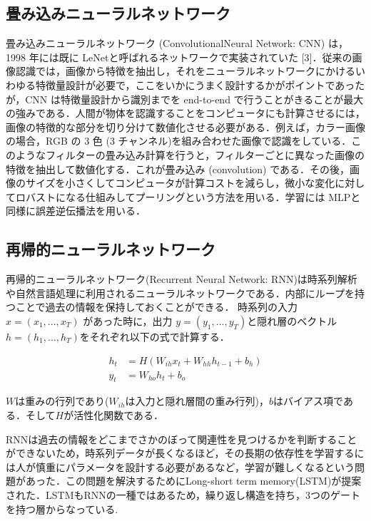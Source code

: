 \subsection{畳み込みニューラルネットワーク}
畳み込みニューラルネットワーク (ConvolutionalNeural Network: CNN) は，1998 年には既に LeNetと呼ばれるネットワークで実装されていた [3]．従来の画像認識では，画像から特徴を抽出し，それをニューラルネットワークにかけるいわゆる特徴量設計が必要で，ここをいかにうまく設計するかがポイントであったが，CNN は特徴量設計から識別までを end-to-end で行うことがきることが最大の強みである．人間が物体を認識することをコンピュータにも計算させるには，画像の特徴的な部分を切り分けて数値化させる必要がある．例えば，カラー画像の場合，RGB の 3 色 (3 チャンネル)を組み合わせた画像で認識をしている．このようなフィルターの畳み込み計算を行うと，フィルターごとに異なった画像の特徴を抽出して数値化する．これが畳み込み (convolution) である．その後，画像のサイズを小さくしてコンピュータが計算コストを減らし，微小な変化に対してロバストになる仕組みしてプーリングという方法を用いる．学習には MLPと同様に誤差逆伝播法を用いる．


\subsection{再帰的ニューラルネットワーク}
再帰的ニューラルネットワーク(Recurrent Neural Network: RNN)は時系列解析や自然言語処理に利用されるニューラルネットワークである．内部にループを持つことで過去の情報を保持しておくことができる．
時系列の入力 $x = (x_1, ... , x_T)$ があった時に，出力 $y = (y_1, ... , y_T)$と隠れ層のベクトル $h = (h_1, ... ,h_T)$をそれぞれ以下の式で計算する．

\begin{align}
\label{eq:RNN}
  h_t & = H(W_{ih} x_t + W_{hh} h_{t-1} + b_h) \\ 
  y_t & = W_{ho} h_t + b_o
\end{align}

$W$は重みの行列であり($W_{ih}$は入力と隠れ層間の重み行列)，$b$はバイアス項である．そして$H$が活性化関数である．

RNNは過去の情報をどこまでさかのぼって関連性を見つけるかを判断することができないため，時系列データが長くなるほど，その長期の依存性を学習するには人が慎重にパラメータを設計する必要があるなど，学習が難しくなるという問題があった．この問題を解決するためにLong-short term memory(LSTM)が提案された．LSTMもRNNの一種ではあるため，繰り返し構造を持ち，3つのゲートを持つ層からなっている. 

